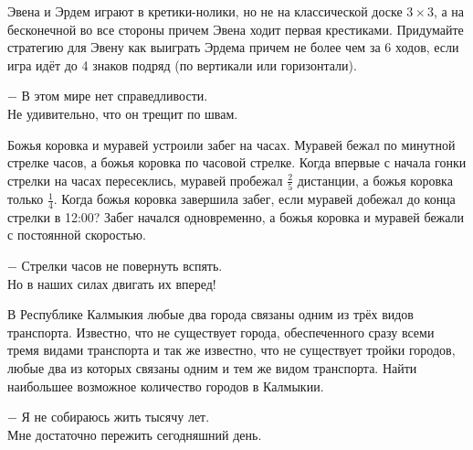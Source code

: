  Эвена и Эрдем играют в кретики-нолики, но не на классической доске $3\times 3$, а на бесконечной во все стороны причем Эвена ходит первая крестиками. Придумайте стратегию для Эвену как выиграть Эрдема причем не более чем за 6 ходов, если игра идёт до 4 знаков подряд (по вертикали или горизонтали).

\begin{flushright}
    \scriptsize{$-$ В этом мире нет справедливости.\\ Не удивительно, что он трещит по швам.}
\end{flushright}

\newpage

\hspace{3mm}

 Божья коровка и муравей устроили забег на часах. Муравей бежал по минутной стрелке часов, а божья коровка по часовой стрелке. Когда впервые с начала гонки стрелки на часах пересеклись, муравей пробежал $\frac{2}{5}$ дистанции, а божья коровка только $\frac{1}{4}$. Когда божья коровка завершила забег, если муравей добежал до конца стрелки в 12:00? Забег начался одновременно, а божья коровка и муравей бежали с постоянной скоростью.

\begin{flushright}
    \scriptsize{$-$ Стрелки часов не повернуть вспять.\\ Но в наших силах двигать их вперед!}
\end{flushright}

\hspace{3mm}

 В Республике Калмыкия любые два города связаны одним из трёх видов транспорта. Известно, что не существует города, обеспеченного сразу всеми тремя видами транспорта и так же известно, что не существует тройки городов, любые два из которых связаны одним и тем же видом транспорта. Найти наибольшее возможное количество городов в Калмыкии.

\begin{flushright}
    \scriptsize{$-$ Я не собираюсь жить тысячу лет.\\ Мне достаточно пережить сегодняшний день.}
\end{flushright}